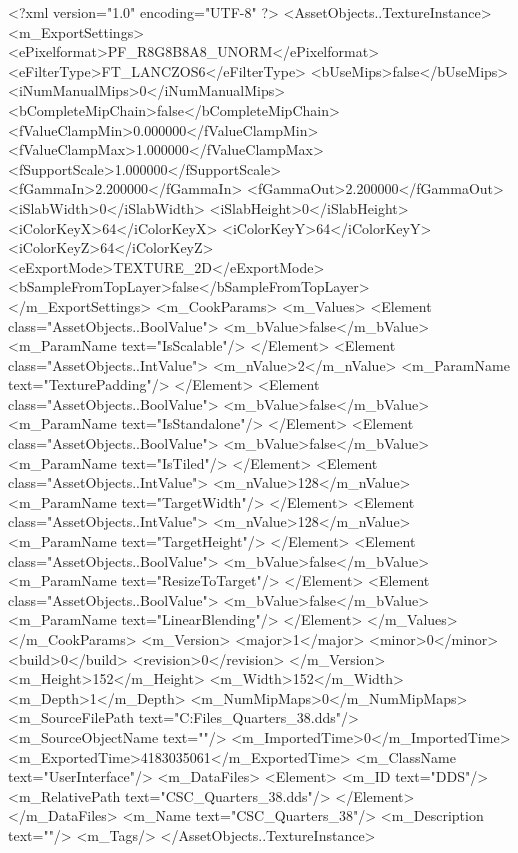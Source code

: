 <?xml version="1.0" encoding="UTF-8" ?>
<AssetObjects..TextureInstance>
	<m_ExportSettings>
		<ePixelformat>PF_R8G8B8A8_UNORM</ePixelformat>
		<eFilterType>FT_LANCZOS6</eFilterType>
		<bUseMips>false</bUseMips>
		<iNumManualMips>0</iNumManualMips>
		<bCompleteMipChain>false</bCompleteMipChain>
		<fValueClampMin>0.000000</fValueClampMin>
		<fValueClampMax>1.000000</fValueClampMax>
		<fSupportScale>1.000000</fSupportScale>
		<fGammaIn>2.200000</fGammaIn>
		<fGammaOut>2.200000</fGammaOut>
		<iSlabWidth>0</iSlabWidth>
		<iSlabHeight>0</iSlabHeight>
		<iColorKeyX>64</iColorKeyX>
		<iColorKeyY>64</iColorKeyY>
		<iColorKeyZ>64</iColorKeyZ>
		<eExportMode>TEXTURE_2D</eExportMode>
		<bSampleFromTopLayer>false</bSampleFromTopLayer>
	</m_ExportSettings>
	<m_CookParams>
		<m_Values>
			<Element class="AssetObjects..BoolValue">
				<m_bValue>false</m_bValue>
				<m_ParamName text="IsScalable"/>
			</Element>
			<Element class="AssetObjects..IntValue">
				<m_nValue>2</m_nValue>
				<m_ParamName text="TexturePadding"/>
			</Element>
			<Element class="AssetObjects..BoolValue">
				<m_bValue>false</m_bValue>
				<m_ParamName text="IsStandalone"/>
			</Element>
			<Element class="AssetObjects..BoolValue">
				<m_bValue>false</m_bValue>
				<m_ParamName text="IsTiled"/>
			</Element>
			<Element class="AssetObjects..IntValue">
				<m_nValue>128</m_nValue>
				<m_ParamName text="TargetWidth"/>
			</Element>
			<Element class="AssetObjects..IntValue">
				<m_nValue>128</m_nValue>
				<m_ParamName text="TargetHeight"/>
			</Element>
			<Element class="AssetObjects..BoolValue">
				<m_bValue>false</m_bValue>
				<m_ParamName text="ResizeToTarget"/>
			</Element>
			<Element class="AssetObjects..BoolValue">
				<m_bValue>false</m_bValue>
				<m_ParamName text="LinearBlending"/>
			</Element>
		</m_Values>
	</m_CookParams>
	<m_Version>
		<major>1</major>
		<minor>0</minor>
		<build>0</build>
		<revision>0</revision>
	</m_Version>
	<m_Height>152</m_Height>
	<m_Width>152</m_Width>
	<m_Depth>1</m_Depth>
	<m_NumMipMaps>0</m_NumMipMaps>
	<m_SourceFilePath text="C:\Users\Shadow\Desktop\Working Files\Icons\Quarters\CSC_Quarters_38.dds"/>
	<m_SourceObjectName text=""/>
	<m_ImportedTime>0</m_ImportedTime>
	<m_ExportedTime>4183035061</m_ExportedTime>
	<m_ClassName text="UserInterface"/>
	<m_DataFiles>
		<Element>
			<m_ID text="DDS"/>
			<m_RelativePath text="CSC_Quarters_38.dds"/>
		</Element>
	</m_DataFiles>
	<m_Name text="CSC_Quarters_38"/>
	<m_Description text=""/>
	<m_Tags/>
</AssetObjects..TextureInstance>

